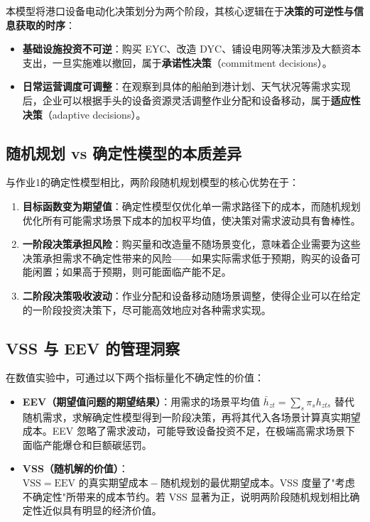 \documentclass[12pt,a4paper]{article}
\newcommand{\手批注}[2]{\textcolor{#1}{\text{\kaishu #2}}}
\newcommand{\一阶段}{\textcolor{firststage}{\text{\kaishu （一阶段）}}}
\newcommand{\二阶段}{\textcolor{secondstage}{\text{\kaishu （二阶段）}}}
\begin{document}
本模型将港口设备电动化决策划分为两个阶段，其核心逻辑在于\textbf{决策的可逆性与信息获取的时序}：

\begin{itemize}[itemsep=0.2em,leftmargin=2em]
    \item \textbf{基础设施投资不可逆}：购买 EYC、改造 DYC、铺设电网等决策涉及大额资本支出，一旦实施难以撤回，属于\textbf{承诺性决策}（commitment decisions）。
    \item \textbf{日常运营调度可调整}：在观察到具体的船舶到港计划、天气状况等需求实现后，企业可以根据手头的设备资源灵活调整作业分配和设备移动，属于\textbf{适应性决策}（adaptive decisions）。
\end{itemize}

\subsection{随机规划 vs 确定性模型的本质差异}

与作业1的确定性模型相比，两阶段随机规划模型的核心优势在于：

\begin{enumerate}[itemsep=0.2em,leftmargin=2em]
    \item \textbf{目标函数变为期望值}：确定性模型仅优化单一需求路径下的成本，而随机规划优化所有可能需求场景下成本的加权平均值，使决策对需求波动具有鲁棒性。
    \item \textbf{一阶段决策承担风险}：购买量和改造量不随场景变化，意味着企业需要为这些决策承担需求不确定性带来的风险——如果实际需求低于预期，购买的设备可能闲置；如果高于预期，则可能面临产能不足。
    \item \textbf{二阶段决策吸收波动}：作业分配和设备移动随场景调整，使得企业可以在给定的一阶段投资决策下，尽可能高效地应对各种需求实现。
\end{enumerate}

\subsection{VSS 与 EEV 的管理洞察}

在数值实验中，可通过以下两个指标量化不确定性的价值：

\begin{itemize}[itemsep=0.2em,leftmargin=2em]
    \item \textbf{EEV（期望值问题的期望结果）}：用需求的场景平均值 $\bar{h}_{zt} = \sum_s \pi_s h_{zts}$ 替代随机需求，求解确定性模型得到一阶段决策，再将其代入各场景计算真实期望成本。EEV 忽略了需求波动，可能导致设备投资不足，在极端高需求场景下面临产能爆仓和巨额碳惩罚。
    \item \textbf{VSS（随机解的价值）}：$\text{VSS} = \text{EEV 的真实期望成本} - \text{随机规划的最优期望成本}$。VSS 度量了"考虑不确定性"所带来的成本节约。若 VSS 显著为正，说明两阶段随机规划相比确定性近似具有明显的经济价值。
\end{itemize}
\end{document}
